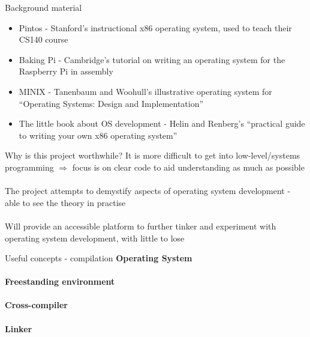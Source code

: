 \documentclass{beamer}
\begin{document}
\begin{frame}{Background material}
    \begin{itemize}
        \item Pintos - Stanford's instructional x86 operating system, used to
            teach their CS140 course
        \item Baking Pi - Cambridge's tutorial on writing an operating system
            for the Raspberry Pi in assembly
        \item MINIX - Tanenbaum and Woohull's illustrative operating system for
            ``Operating Systems: Design and Implementation''
        \item The little book about OS development - Helin and Renberg's
            ``practical guide to writing your own x86 operating system''
    \end{itemize}
\end{frame}

\begin{frame}{Why is this project worthwhile?}
\centering
    It is more difficult to get into low-level/systems programming $\Rightarrow$
    focus is on clear code to aid understanding as much as possible \\~\\

    The project attempts to demystify aspects of operating system development -
    able to see the theory in practise \\~\\

    Will provide an accessible platform to further tinker and experiment with
    operating system development, with little to lose
\end{frame}

\begin{frame}{Useful concepts - compilation}
    \textbf{Operating System} \\~\\
    \textbf{Freestanding environment} \\~\\
    \textbf{Cross-compiler} \\~\\
    \textbf{Linker} \\~\\

\end{frame}
\end{document}
